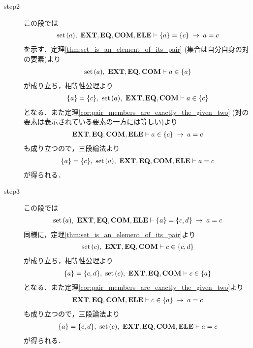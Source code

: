 \begin{sketch}
\begin{description}
			\item[step2] この段では
				\begin{align}
					\operatorname*{set}\hspace{0.15em}(a),\ \mbox{{\bf EXT}},\mbox{{\bf EQ}},\mbox{\bf COM},\mbox{{\bf ELE}} \vdash \{a\} = \{c\} \hspace{0.25em}\rightarrow\hspace{0.25em} a = c 
				\end{align}
				を示す．定理\ref{thm:set_is_an_element_of_its_pair} (集合は自分自身の対の要素)より
				\begin{align}
					\operatorname*{set}\hspace{0.15em}(a),\ \mbox{{\bf EXT}},\mbox{{\bf EQ}},\mbox{\bf COM} \vdash a \in \{a\}
				\end{align}
				が成り立ち，相等性公理より
				\begin{align}
					\{a\} = \{c\},\ \operatorname*{set}\hspace{0.15em}(a),\ \mbox{{\bf EXT}},\mbox{{\bf EQ}},\mbox{\bf COM} \vdash a \in \{c\}
				\end{align}
				となる．また定理\ref{cor:pair_members_are_exactly_the_given_two}
				(対の要素は表示されている要素の一方には等しい)より
				\begin{align}
					\mbox{{\bf EXT}},\mbox{{\bf EQ}},\mbox{\bf COM},\mbox{{\bf ELE}} \vdash a \in \{c\} \hspace{0.25em}\rightarrow\hspace{0.25em} a = c
				\end{align}
				も成り立つので，三段論法より
				\begin{align}
					\{a\} = \{c\},\ \operatorname*{set}\hspace{0.15em}(a),\ \mbox{{\bf EXT}},\mbox{{\bf EQ}},\mbox{\bf COM},\mbox{{\bf ELE}} \vdash a = c
					\label{fom:equality_of_ordered_pairs_3}
				\end{align}
				が得られる．
				
			\item[step3] この段では
				\begin{align}
					\operatorname*{set}\hspace{0.15em}(a),\ \mbox{{\bf EXT}},\mbox{{\bf EQ}},\mbox{\bf COM},\mbox{{\bf ELE}} \vdash \{a\} = \{c,d\} \hspace{0.25em}\rightarrow\hspace{0.25em} a = c
				\end{align}
				同様に，定理\ref{thm:set_is_an_element_of_its_pair}より
				\begin{align}
					\operatorname*{set}\hspace{0.15em}(c),\ \mbox{{\bf EXT}},\mbox{{\bf EQ}},\mbox{\bf COM} \vdash c \in \{c,d\}
				\end{align}
				が成り立ち，相等性公理より
				\begin{align}
					\{a\} = \{c,d\},\ \operatorname*{set}\hspace{0.15em}(c),\ \mbox{{\bf EXT}},\mbox{{\bf EQ}},\mbox{\bf COM} \vdash c \in \{a\}
				\end{align}
				となる．また定理\ref{cor:pair_members_are_exactly_the_given_two}より
				\begin{align}
					\mbox{{\bf EXT}},\mbox{{\bf EQ}},\mbox{\bf COM},\mbox{{\bf ELE}} \vdash c \in \{a\} \hspace{0.25em}\rightarrow\hspace{0.25em} a = c
				\end{align}
				も成り立つので，三段論法より
				\begin{align}
					\{a\} = \{c,d\},\ \set{c},\ \EXTAX,\EQAX,\COMAX,\ELEAX \vdash a = c
					\label{fom:equality_of_ordered_pairs_4}
				\end{align}
				が得られる．
				

\end{description}
\end{sketch}
